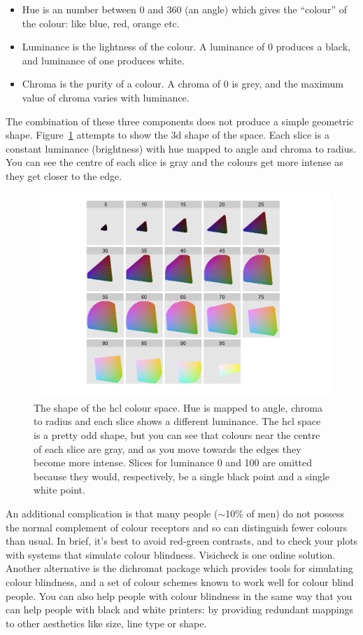 \begin{itemize}
  \item Hue is an number between 0 and 360 (an angle) which gives the ``colour'' of the colour: like blue, red, orange etc.
  \item Luminance is the lightness of the colour.  A luminance of 0 produces a black, and luminance of one produces white.
  \item Chroma is the purity of a colour.  A chroma of 0 is grey, and the maximum value of chroma varies with luminance.
\end{itemize} 

The combination of these three components does not produce a simple geometric shape.  Figure~\ref{fig:hcl} attempts to show the 3d shape of the space.  Each slice is a constant luminance (brightness) with hue mapped to angle and chroma to radius.  You can see the centre of each slice is gray and the colours get more intense as they get closer to the edge.

\begin{figure}[htbp]
  \centering
    \includegraphics[width=\linewidth]{hcl-space}
  \caption{The shape of the hcl colour space.  Hue is mapped to angle, chroma to radius and each slice shows a different luminance.  The hcl space is a pretty odd shape, but you can see that colours near the centre of each slice are gray, and as you move towards the edges they become more intense.  Slices for luminance 0 and 100 are omitted because they would, respectively, be a single black point and a single white point.}
  \label{fig:hcl}
\end{figure}

An additional complication is that many people ($\sim$10\% of men) do not possess the normal complement of colour receptors and so can distinguish fewer colours than usual. In brief, it's best to avoid red-green contrasts, and to check your plots with systems that simulate colour blindness. Visicheck is one online solution. Another alternative is the dichromat package \citep{dichromat} which provides tools for simulating colour blindness, and a set of colour schemes known to work well for colour blind people. You can also help people with colour blindness in the same way that you can help people with black and white printers: by providing redundant mappings to other aesthetics like size, line type or shape.

